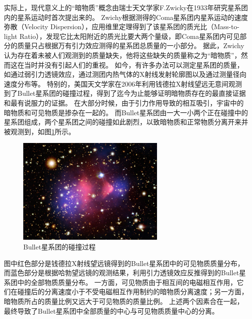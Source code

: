 实际上，现代意义上的“暗物质”概念由瑞士天文学家F.Zwicky在1933年研究星系团内的星系运动时首次提出来的\parencite{zwicky1933spectral}。
Zwichy根据测得的Coma星系团内星系运动的速度弥散（Velocity Dispersion），应用维里定理得到了该星系团的质光比（Mass-to-light Ratio），发现它比太阳附近的质光比要大两个量级，即Coma星系团内可见部分的质量只占根据万有引力效应测得的星系团总质量的一小部分。
据此，Zwichy认为存在着未被人们观测到的质量缺失，他将这些缺失的质量称之为“暗物质”，然而这在当时并没有引起人们的重视。
如今，有许多办法可以测定星系团的质量，如通过弱引力透镜效应，通过测团内热气体的X射线发射轮廓图以及通过测量径向速度分布等。
特别的，美国天文学家在2006年利用钱德拉X射线望远无意间观测到了Bullet星系团的碰撞过程\parencite{bullet_cluster}，得到了迄今为止能够证明暗物质存在的最直接证据和最有说服力的证据。
在大部分时候，由于引力作用导致的相互吸引，宇宙中的暗物质和可见物质是掺杂在一起的。
而Bullet星系团由一大一小两个正在碰撞中的星系团组成，两个星系团之间的碰撞如此剧烈，以致暗物质和正常物质分离开来并被观测到，如图\ref{fig:introduction:bullet_cluster}所示。
\begin{figure}[htbp]
	\centering
	\includegraphics[width=0.65\textwidth]{chap/introduction/fig/bullet_cluster.jpg}
	\caption{Bullet星系团的碰撞过程\parencite{bullet_cluster}}
	\label{fig:introduction:bullet_cluster}
\end{figure}
图中红色部分是钱德拉X射线望远镜得到的Bullet星系团中的可见物质质量分布，而蓝色部分是根据哈勃望远镜的观测结果，利用引力透镜效应反推得到的Bullet星系团中的全部物质质量分布。
一方面，可见物质由于相互间的电磁相互作用，它们在碰撞后的分离速度小于不受电磁相互作用制约的暗物质分离速度；另一方面，暗物质所占的质量比例又远大于可见物质的质量比例。
上述两个因素合在一起，最终导致了Bullet星系团中全部质量的中心与可见物质质量中心的分离。


